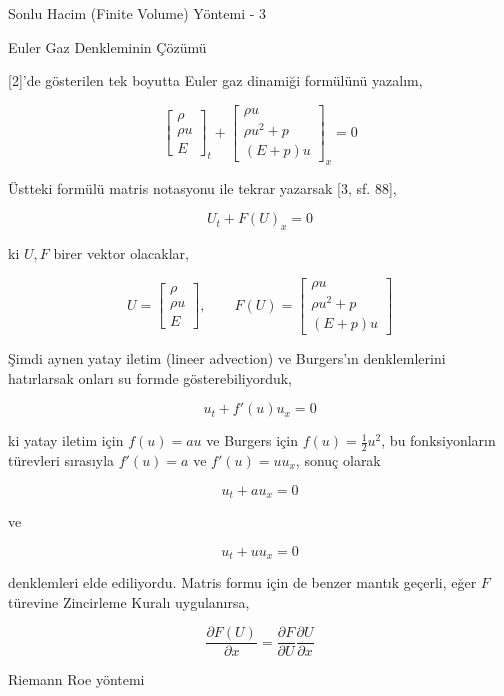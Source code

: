 \documentclass[12pt,fleqn]{article}\usepackage{../../common}
\begin{document}
Sonlu Hacim (Finite Volume) Yöntemi - 3

Euler Gaz Denkleminin Çözümü

[2]'de gösterilen tek boyutta Euler gaz dinamiği formülünü yazalım,

$$
\left[\begin{array}{c}
\rho \\ \rho u  \\ E
\end{array}\right]_t
+
\left[\begin{array}{c}
\rho u \\ \rho u^2 + p \\ (E+p) u 
\end{array}\right]_x 
= 0
$$

Üstteki formülü matris notasyonu ile tekrar yazarsak [3, sf. 88],

$$
U_t + F(U)_x = 0
$$

ki $U,F$ birer vektor olacaklar,

$$
U = \left[\begin{array}{c}
\rho \\ \rho u  \\ E
\end{array}\right], \qquad
F(U) =
\left[\begin{array}{c}
\rho u \\ \rho u^2 + p \\ (E+p) u 
\end{array}\right]
$$

Şimdi aynen yatay iletim (lineer advection) ve Burgers'ın denklemlerini
hatırlarsak onları su formde gösterebiliyorduk,

$$
u_t + f'(u) u_x = 0
$$

ki yatay iletim için $f(u) = au$ ve Burgers için $f(u) = \frac{1}{2} u^2$,
bu fonksiyonların türevleri sırasıyla $f'(u) = a$ ve $f'(u) = u u_x$,
sonuç olarak

$$
u_t + a u_x = 0
$$

ve

$$
u_t + u u_x = 0
$$

denklemleri elde ediliyordu. Matris formu için de benzer mantık geçerli,
eğer $F$ türevine Zincirleme Kuralı uygulanırsa,

$$
\frac{\partial F(U)}{\partial x} =
\frac{\partial F}{\partial U} \frac{\partial U}{\partial x}
$$




Riemann Roe yöntemi 
\end{document}
